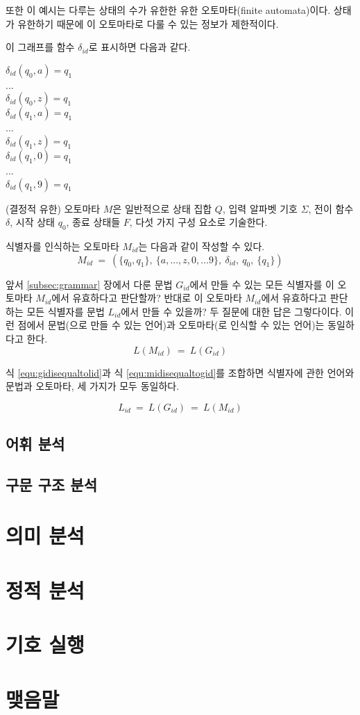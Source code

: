 \documentclass[a4paper]{book}
\begin{document}
또한 이 예시는 다루는 상태의 수가 유한한 유한 오토마타(finite
automata)이다. 상태가 유한하기 때문에 이 오토마타로 다룰 수 있는
정보가 제한적이다.


이 그래프를 함수 $\delta_{id}$로 표시하면 다음과 같다.

\begin{center}
  $\delta_{id}(q_0, a) = q_1$ \\
  ... \\
  $\delta_{id}(q_0, z) = q_1$ \\
  $\delta_{id}(q_1, a) = q_1$ \\
  ... \\
  $\delta_{id}(q_1, z) = q_1$ \\
  $\delta_{id}(q_1, 0) = q_1$ \\
  ... \\
  $\delta_{id}(q_1, 9) = q_1$ \\
\end{center}

(결정적 유한) 오토마타 $M$은 일반적으로 상태 집합 $Q$, 입력 알파벳
기호 $\Sigma$, 전이 함수 $\delta$, 시작 상태 $q_0$, 종료 상태들 $F$,
다섯 가지 구성 요소로 기술한다.


식별자를 인식하는 오토마타 $M_{id}$는 다음과 같이 작성할 수 있다.
\[
M_{id} \ = \ (\{q_0,q_1\}, \ \{a,...,z,0,...9\}, \ \delta_{id}, \ q_0, \ \{q_1\} )
\]

앞서 \ref{subsec:grammar} 장에서 다룬 문법 $G_{id}$에서 만들 수 있는
모든 식별자를 이 오토마타 $M_{id}$에서 유효하다고 판단할까? 반대로 이
오토마타 $M_{id}$에서 유효하다고 판단하는 모든 식별자를 문법
$L_{id}$에서 만들 수 있을까? 두 질문에 대한 답은 그렇다이다.
%
이런 점에서 문법(으로 만들 수 있는 언어)과 오토마타(로 인식할 수 있는
언어)는 동일하다고 한다.
\begin{equation}
  L(M_{id}) \ = \ L(G_{id})
  \label{equ:midisequaltogid}
\end{equation}

식 \ref{equ:gidisequaltolid}과 식 \ref{equ:midisequaltogid}를 조합하면
식별자에 관한 언어와 문법과 오토마타, 세 가지가 모두 동일하다.


\begin{equation}
  L_{id} \ = \ L(G_{id}) \ = \ L(M_{id})
  \label{equ:lisisequaltomidisequaltogid}
\end{equation}

\section{어휘 분석}

\section{구문 구조 분석}

\chapter{의미 분석}

\chapter{정적 분석}

\chapter{기호 실행}

\chapter{맺음말}
\end{document}
